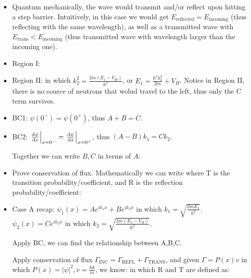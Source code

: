 \documentclass{school-22.101-notes}
\begin{document}
\begin{itemize}
\item Quantum mechanically, the wave would transmit and/or reflect upon hitting a step barrier. Intuitively, in this case we would get $E_{\mathrm{reflected}} = E_{\mathrm{incoming}}$ (thus reflecting with the same wavelength), as well as a transmitted wave with $E_{\mathrm{trans}} < E_{\mathrm{incoming}}$ (thus transmitted wave with wavelength larger than the incoming one). 

\item Region I: 

\item Region II:
in which $k_2^2 = \frac{2m (E_1 - V_H)}{\hbar^2}$, or $E_1  = \frac{\hbar^2 k_2^2}{2m} + V_H$. Notice in Region II, there is no source of neutrons that wolud travel to the left, thus only the C term survives. 

\item BC1: $\psi(0^-) = \psi(0^+)$, thus $A+B = C$. 

\item BC2: $\left. \frac{\mathrm{d}\psi}{\mathrm{d}x} \right|_{x=0^-} = \left. \frac{\mathrm{d}\psi}{\mathrm{d}x} \right|_{x=0^+}$, thus $(A - B) k_1 = C k_2$. 

Together we can write $B, C$ in terms of $A$:

\item Prove conservation of flux. Mathematically we can write 
where T is the transition probability/coefficient, and R is the reflection probability/coefficient:

\item Case A recap: 
$\psi_1 (x) = A e^{ik_1 x} + B e^{i k_2 x}$ in which $k_1 = \sqrt{\frac{2 m E_1}{\hbar^2}}$. \\
$\psi_2 (x) = C e^{ik_2 x}$ in which $k_2 = \sqrt{\frac{2 m (E_1 - V_H)}{\hbar^2}}$. 

Apply BC, we can find the relationship between A,B,C. 

Apply conservation of flux $\Gamma_{\mbox{INC}} = \Gamma_{\mbox{REFL}} + \Gamma_{\mbox{TRANS}}$, and given $\Gamma = P(x) v$ in which $P(x) = |\psi|^2, v = \frac{\hbar k}{m}$, we know: 
in which R and T are defined as:
\end{itemize}
\end{document}
